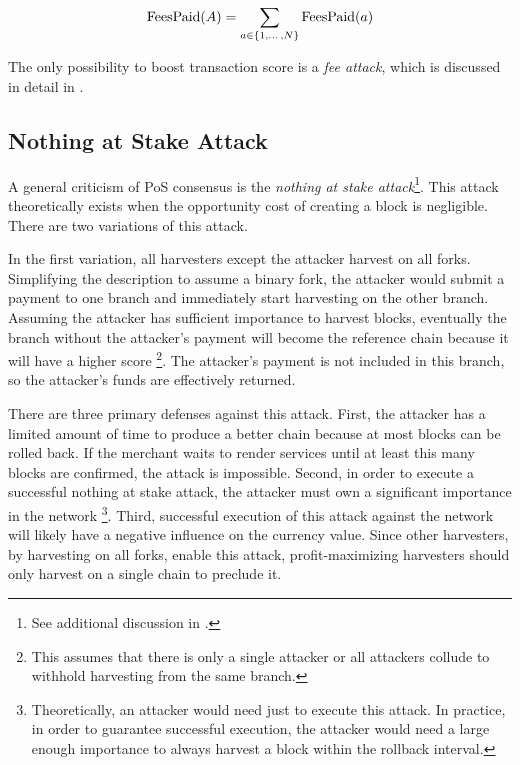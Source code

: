 \begin{equation}
	\mathrm{FeesPaid}(A) = \sum\limits_{a \in \{1, \dotso, N\}} \mathrm{FeesPaid}(a)
\end{equation}

The only possibility to boost transaction score is a \emph{fee attack}, which is discussed in detail in .

\subsection{Nothing at Stake Attack}

A general criticism of PoS consensus is the \emph{nothing at stake attack}\footnote{See additional discussion in .}.
This attack theoretically exists when the opportunity cost of creating a block is negligible.
There are two variations of this attack.

In the first variation, all harvesters except the attacker harvest on all forks.
Simplifying the description to assume a binary fork, the attacker would submit a payment to one branch and immediately start harvesting on the other branch.
Assuming the attacker has sufficient importance to harvest blocks, eventually the branch without the attacker's payment will become the reference chain because it will have a higher score
\footnote{This assumes that there is only a single attacker or all attackers collude to withhold harvesting from the same branch.}.
The attacker's payment is not included in this branch, so the attacker's funds are effectively returned.

There are three primary defenses against this attack.
First, the attacker has a limited amount of time to produce a better chain because at most  blocks can be rolled back.
If the merchant waits to render services until at least this many blocks are confirmed, the attack is impossible.
Second, in order to execute a successful nothing at stake attack, the attacker must own a significant importance in the network
\footnote{
	Theoretically, an attacker would need just  to execute this attack.
	In practice, in order to guarantee successful execution, the attacker would need a large enough importance to always harvest a block within the rollback interval.
}.
Third, successful execution of this attack against the network will likely have a negative influence on the currency value.
Since other harvesters, by harvesting on all forks, enable this attack, profit-maximizing harvesters should only harvest on a single chain to preclude it.

